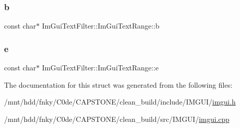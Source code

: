 \subsubsection{\texorpdfstring{b}{b}}
{\footnotesize\ttfamily const char$\ast$ Im\+Gui\+Text\+Filter\+::\+Im\+Gui\+Text\+Range\+::b}

\mbox{\label{structImGuiTextFilter_1_1ImGuiTextRange_aa522cbb493ad3e02646938661c37ec0e}} 
\subsubsection{\texorpdfstring{e}{e}}
{\footnotesize\ttfamily const char$\ast$ Im\+Gui\+Text\+Filter\+::\+Im\+Gui\+Text\+Range\+::e}



The documentation for this struct was generated from the following files\+:\begin{DoxyCompactItemize}
\item 
/mnt/hdd/fnky/\+C0de/\+C\+A\+P\+S\+T\+O\+N\+E/clean\+\_\+build/include/\+I\+M\+G\+U\+I/\hyperlink{imgui_8h}{imgui.\+h}\item 
/mnt/hdd/fnky/\+C0de/\+C\+A\+P\+S\+T\+O\+N\+E/clean\+\_\+build/src/\+I\+M\+G\+U\+I/\hyperlink{imgui_8cpp}{imgui.\+cpp}\end{DoxyCompactItemize}
